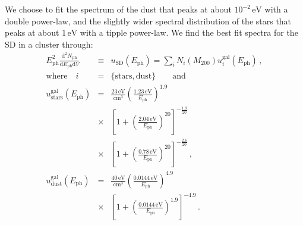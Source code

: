 \documentclass[10pt,aps,pra,reprint,amsmath,amsfonts,amssymb,showpacs,nofootinbib,floatfix]{revtex4-1}
\newcommand{\rmn}{\mathrm}
\newcommand{\ph}{\rmn{ph}}
\newcommand{\eph}{E_\ph}
\newcommand{\gal}{\rmn{gal}}
\newcommand{\sd}{\rmn{SD}}
\newcommand{\stars}{\rmn{stars}}
\newcommand{\dust}{\rmn{dust}}
\newcommand{\lx}{L_\rmn{X}}
\newcommand{\ev}{\rmn{eV}}
\newcommand{\dd}{\rmn{d}}
\newcommand{\mvir}{M_{200}}
\begin{document}
We choose to fit the spectrum of the dust that peaks at about
$10^{-2}\,\ev$ with a double power-law, and the slightly wider
spectral distribution of the stars that peaks at about $1\,\ev$ with a
tipple power-law. We find the best fit spectra for the SD in a
cluster through:
\begin{eqnarray}
  \eph^2\frac{\dd^2 N_\ph}{\dd \eph \dd V}
  &\equiv& u_\sd(\eph) =  \sum_i N_i(\mvir) u_i^\gal(\eph)\,,\nonumber \\ 
\rmn{where}\quad i&=&\{\rmn{stars,dust}\} \qquad \rmn{and}\\ 
  u_\stars^\gal(\eph) &=& \frac{23\,\rmn{eV}}{\rmn{cm}^3} 
  \left(\frac{1.23\,\rmn{eV}}{\eph}\right)^{1.9} \nonumber \\
  &\times&\left[1+\left(\frac{2.04\,\rmn{eV}}{\eph}\right)^{20}\right]
  ^{-\frac{1.9}{20}}\nonumber \\
  &\times& \left[1+\left(\frac{0.78\,\rmn{eV}}{\eph}\right)^{20}\right]^{-\frac{2.6}{20}}\,, \\
  u_\dust^\gal(\eph) &=& 
  \frac{40\,\rmn{eV}}{\rmn{cm}^3} 
  \left(\frac{0.0144\,\rmn{eV}}{\eph}\right)^{4.9}\nonumber \\
  &\times& \left[1+\left(\frac{0.0144\,\rmn{eV}}{\eph}\right)^{1.9}\right]^{-4.9}\,.
\end{eqnarray}
\end{document}
